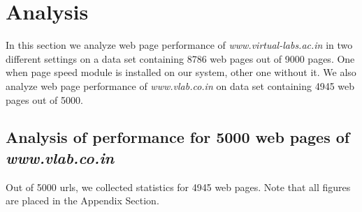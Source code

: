 \documentclass[conference]{IEEEtran}
\begin{document}
\section{Analysis}\label{sec-6}
In this section we analyze web page performance of {\it www.virtual-labs.ac.in} in two different settings on a data set containing 8786 web pages
out of 9000 pages.
One when page speed module is installed on our system, other one without it. We also analyze web page performance of {\it www.vlab.co.in}  
on data set containing 4945 web pages out of 5000.
\subsection{Analysis of performance for 5000 web pages of {\it www.vlab.co.in}}
 Out of 5000 urls, we collected statistics for 4945 web pages. Note that all figures are placed in the Appendix Section.
\end{document}

